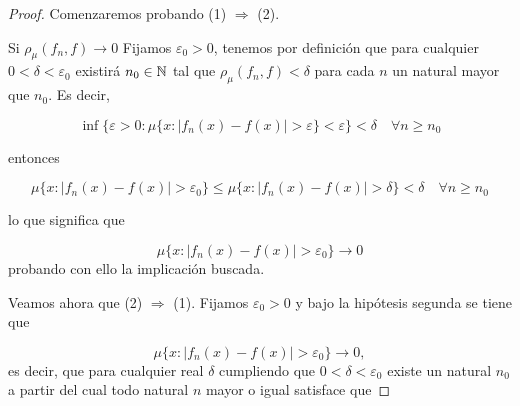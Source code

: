 
\begin{proof}
    Comenzaremos probando (1) $\Rightarrow$ (2). 

    Si $\rho_{\mu}(f_n, f) \longrightarrow 0$
    Fijamos $\varepsilon_0 > 0$, tenemos por definición que 
    para cualquier $0 < \delta < \varepsilon_0$ existirá $n_0 \in \mathbb{N}$ tal que 
    $\rho_{\mu}(f_n, f) < \delta$ para cada $n$ un natural mayor que $n_0$. Es decir,  
    

    $$\inf \{ \varepsilon > 0: \mu \{ x : |f_n(x) - f(x)| > \varepsilon \} < \varepsilon \} < \delta \quad \forall n \geq n_0$$

    entonces 

    \begin{equation}
        \mu \{ x : |f_n(x) - f(x)| > \varepsilon_0 \}
        \leq
        \mu \{ x : |f_n(x) - f(x)| > \delta\}
        < \delta 
        \quad 
        \forall n \geq n_0
    \end{equation}

    lo que significa que 

    \begin{equation}
        \mu \{ x : |f_n(x) - f(x)| > \varepsilon_0 \}
        \longrightarrow
        0  
    \end{equation}
    probando con ello la implicación buscada.

    Veamos ahora que (2) $\Rightarrow$ (1). 
    Fijamos $\varepsilon_0 > 0$ y bajo la hipótesis segunda se tiene que 

    \begin{equation}
        \mu \{ x : |f_n(x) - f(x)| > \varepsilon_0 \}
        \longrightarrow
        0,  
    \end{equation}
    es decir, que para cualquier real $\delta$ cumpliendo que $0 < \delta < \varepsilon_0$ 
    existe un natural $n_0$ a partir del cual todo natural $n$ mayor o igual satisface que 
    

\end{proof}
